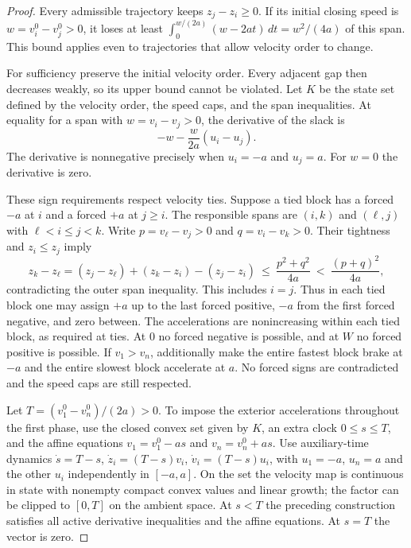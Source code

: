 \documentclass[11pt]{article}
\begin{document}
\begin{proof}
Every admissible trajectory keeps $z_j-z_i\ge0$. If its initial closing speed is $w=v_i^0-v_j^0>0$, it loses at least $\int_0^{w/(2a)}(w-2at)\,dt=w^2/(4a)$ of this span. This bound applies even to trajectories that allow velocity order to change.

For sufficiency preserve the initial velocity order. Every adjacent gap then decreases weakly, so its upper bound cannot be violated. Let $K$ be the state set defined by the velocity order, the speed caps, and the span inequalities. At equality for a span with $w=v_i-v_j>0$, the derivative of the slack is
\[
 -w-\frac{w}{2a}(u_i-u_j).
\]
The derivative is nonnegative precisely when $u_i=-a$ and $u_j=a$. For $w=0$ the derivative is zero.

These sign requirements respect velocity ties. Suppose a tied block has a forced $-a$ at $i$ and a forced $+a$ at $j\ge i$. The responsible spans are $(i,k)$ and $(\ell,j)$ with $\ell<i\le j<k$. Write $p=v_\ell-v_j>0$ and $q=v_i-v_k>0$. Their tightness and $z_i\le z_j$ imply
\[
 z_k-z_\ell = (z_j-z_\ell)+(z_k-z_i)-(z_j-z_i)
 \ \le\ \frac{p^2+q^2}{4a}\ <\ \frac{(p+q)^2}{4a},
\]
contradicting the outer span inequality. This includes $i=j$. Thus in each tied block one may assign $+a$ up to the last forced positive, $-a$ from the first forced negative, and zero between. The accelerations are nonincreasing within each tied block, as required at ties. At $0$ no forced negative is possible, and at $W$ no forced positive is possible. If $v_1>v_n$, additionally make the entire fastest block brake at $-a$ and the entire slowest block accelerate at $a$. No forced signs are contradicted and the speed caps are still respected.

Let $T=(v_1^0-v_n^0)/(2a)>0$. To impose the exterior accelerations throughout the first phase, use the closed convex set given by $K$, an extra clock $0\le s\le T$, and the affine equations $v_1=v_1^0-as$ and $v_n=v_n^0+as$. Use auxiliary-time dynamics $\dot s=T-s$, $\dot z_i=(T-s)v_i$, $\dot v_i=(T-s)u_i$, with $u_1=-a$, $u_n=a$ and the other $u_i$ independently in $[-a,a]$. On the set the velocity map is continuous in state with nonempty compact convex values and linear growth; the factor can be clipped to $[0,T]$ on the ambient space. At $s<T$ the preceding construction satisfies all active derivative inequalities and the affine equations. At $s=T$ the vector is zero.


\end{proof}
\end{document}
